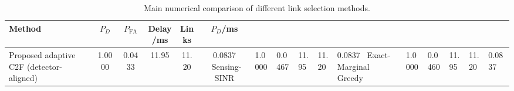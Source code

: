 \begin{table}[t]
    \centering
    \caption{Main numerical comparison of different link selection methods.}
    \label{tab:main_summary}
    \begin{tabular}{l c c c c c}
        \hline
        Method & $P_D$ & $P_{\mathrm{FA}}$ & Delay/ms & Links & $P_D$/ms \\
        \hline
        Proposed adaptive C2F (detector-aligned) & 1.0000 & 0.0433 & 11.95 & 11.20 & 0.0837 \
        Sensing-SINR & 1.0000 & 0.0467 & 11.95 & 11.20 & 0.0837 \
        Exact-Marginal Greedy & 1.0000 & 0.0460 & 11.95 & 11.20 & 0.0837 \
        \hline
    \end{tabular}
\end{table}
